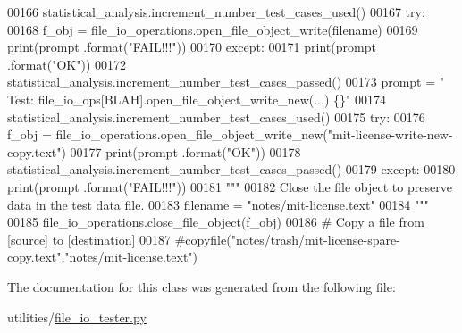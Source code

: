 \begin{DoxyCode}
00166         statistical\_analysis.increment\_number\_test\_cases\_used()
00167         \textcolor{keywordflow}{try}:
00168             f\_obj = file\_io\_operations.open\_file\_object\_write(filename)
00169             print(prompt .format(\textcolor{stringliteral}{"FAIL!!!"}))
00170         \textcolor{keywordflow}{except}:
00171             print(prompt .format(\textcolor{stringliteral}{"OK"}))
00172             statistical\_analysis.increment\_number\_test\_cases\_passed()
00173         prompt = \textcolor{stringliteral}{"  Test: file\_io\_ops[BLAH].open\_file\_object\_write\_new(...) \{\}"}
00174         statistical\_analysis.increment\_number\_test\_cases\_used()
00175         \textcolor{keywordflow}{try}:
00176             f\_obj = file\_io\_operations.open\_file\_object\_write\_new(\textcolor{stringliteral}{"mit-license-write-new-copy.text"})
00177             print(prompt .format(\textcolor{stringliteral}{"OK"}))
00178             statistical\_analysis.increment\_number\_test\_cases\_passed()
00179         \textcolor{keywordflow}{except}:
00180             print(prompt .format(\textcolor{stringliteral}{"FAIL!!!"}))
00181         \textcolor{stringliteral}{"""}
00182 \textcolor{stringliteral}{            Close the file object to preserve data in the test data file.}
00183 \textcolor{stringliteral}{            filename = "notes/mit-license.text"}
00184 \textcolor{stringliteral}{        """}
00185         file\_io\_operations.close\_file\_object(f\_obj)
00186         \textcolor{comment}{# Copy a file from [source] to [destination]}
00187         \textcolor{comment}{#copyfile("notes/trash/mit-license-spare-copy.text","notes/mit-license.text")}
\end{DoxyCode}


The documentation for this class was generated from the following file\+:\begin{DoxyCompactItemize}
\item 
utilities/\hyperlink{file__io__tester_8py}{file\+\_\+io\+\_\+tester.\+py}\end{DoxyCompactItemize}
